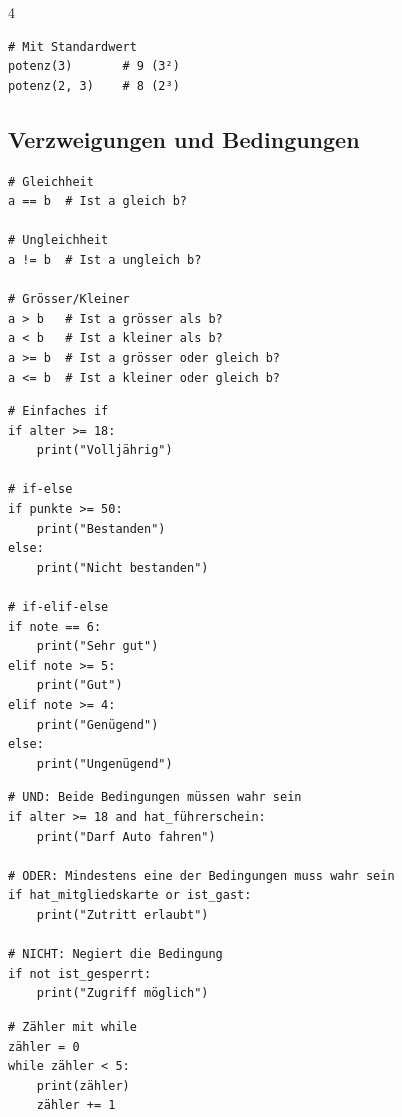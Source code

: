 \begin{landscape}
\begin{multicols*}{4}
\begin{cheatSheetBox}[title=Funktionen aufrufen]
\begin{lstlisting}
# Mit Standardwert
potenz(3)       # 9 (3²)
potenz(2, 3)    # 8 (2³)
\end{lstlisting}
		\end{cheatSheetBox}

		\columnbreak\textcolor{\cheatSheetColor}{\subsection*{Verzweigungen und Bedingungen}}

		\begin{cheatSheetBox}[title=Vergleichsoperatoren]
			\begin{lstlisting}
# Gleichheit
a == b  # Ist a gleich b?

# Ungleichheit
a != b  # Ist a ungleich b?

# Grösser/Kleiner
a > b   # Ist a grösser als b?
a < b   # Ist a kleiner als b?
a >= b  # Ist a grösser oder gleich b?
a <= b  # Ist a kleiner oder gleich b?
\end{lstlisting}
		\end{cheatSheetBox}

		\begin{cheatSheetBox}[title={if, elif, else}]
			\begin{lstlisting}
# Einfaches if
if alter >= 18:
    print("Volljährig")

# if-else
if punkte >= 50:
    print("Bestanden")
else:
    print("Nicht bestanden")

# if-elif-else
if note == 6:
    print("Sehr gut")
elif note >= 5:
    print("Gut")
elif note >= 4:
    print("Genügend")
else:
    print("Ungenügend")
\end{lstlisting}
		\end{cheatSheetBox}

		\begin{cheatSheetBox}[title=Logische Operatoren]
			\begin{lstlisting}
# UND: Beide Bedingungen müssen wahr sein
if alter >= 18 and hat_führerschein:
    print("Darf Auto fahren")

# ODER: Mindestens eine der Bedingungen muss wahr sein
if hat_mitgliedskarte or ist_gast:
    print("Zutritt erlaubt")

# NICHT: Negiert die Bedingung
if not ist_gesperrt:
    print("Zugriff möglich")
\end{lstlisting}
		\end{cheatSheetBox}

		\begin{cheatSheetBox}[title=while-Schleife]
			\begin{lstlisting}
# Zähler mit while
zähler = 0
while zähler < 5:
    print(zähler)
    zähler += 1


\end{lstlisting}
\end{cheatSheetBox}
\end{multicols*}
\end{landscape}
